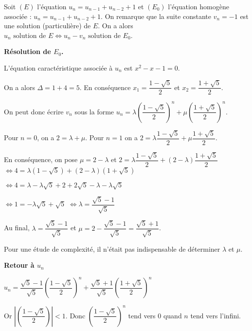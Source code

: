 \documentclass[10pt,fleqn]{article} %
\begin{document}

\vspace{4cm}
\pagestyle{fancy}
\thispagestyle{plain}


\def\columnseprulecolor{\color{ocre}}
\setlength{\columnseprule}{0.4pt} 
\ifprof
\else
\begin{multicols}{2}
\fi




Soit $(E)$ l'équation $u_n = u_{n-1} + u_{n-2}+1$ et $(E_0)$ l'équation homogène associée : $u_n = u_{n-1} + u_{n-2}+1$. On remarque que la suite constante $v_n=-1$ est une solution (particulière) de $E$. 
On a alors $u_n \text{ solution de } E \Leftrightarrow u_n-v_n \text{ solution de } E_0$. 

\textbf{Résolution de $E_0$.}

L'équation caractéristique associée à $u_n$ est $x^2 -x -1=0$. 

On a alors $\Delta = 1+4 = 5$. En conséquence $x_1 = \dfrac{1-\sqrt{5}}{2}$ et $x_2 = \dfrac{1+\sqrt{5}}{2}$.


On peut donc écrire $v_n$ sous la forme $u_n=\lambda \left(\dfrac{1-\sqrt{5}}{2}\right)^n+\mu \left(\dfrac{1+\sqrt{5}}{2}\right)^n$.

Pour $n=0$, on a $2=\lambda+\mu$. Pour $n=1$ on a $2=\lambda \dfrac{1-\sqrt{5}}{2}+\mu \dfrac{1+\sqrt{5}}{2}$.

En conséquence, on pose $\mu=2-\lambda$ et 
$2=\lambda \dfrac{1-\sqrt{5}}{2}+\left(2-\lambda\right) \dfrac{1+\sqrt{5}}{2}$
$\Leftrightarrow 4=\lambda (1-\sqrt{5})+\left(2-\lambda\right) (1+\sqrt{5})$

$\Leftrightarrow 4=\lambda-\lambda\sqrt{5}+ 2+2\sqrt{5}-\lambda - \lambda\sqrt{5}$

$\Leftrightarrow 1=-\lambda\sqrt{5}+\sqrt{5} $
$\Leftrightarrow \lambda=\dfrac{\sqrt{5}-1}{\sqrt{5}} $

Au final, $ \lambda=\dfrac{\sqrt{5}-1}{\sqrt{5}} $ et  $\mu=2-\dfrac{\sqrt{5}-1}{\sqrt{5}}=\dfrac{\sqrt{5}+1}{\sqrt{5}}$.

\begin{rem}
Pour une étude de complexité, il n'était pas indispensable de déterminer $\lambda$ et $\mu$.
\end{rem}
\textbf{Retour à $u_n$}

$ u_n = \dfrac{\sqrt{5}-1}{\sqrt{5}} \left(\dfrac{1-\sqrt{5}}{2}\right)^n+\dfrac{\sqrt{5}+1}{\sqrt{5}} \left(\dfrac{1+\sqrt{5}}{2}\right)^n$


Or $\left|  \left(\dfrac{1-\sqrt{5}}{2}\right) \right| <1$. Donc $\left(\dfrac{1-\sqrt{5}}{2}\right)^n$ tend vers 0 quand $n$ tend vers l'infini.


\end{multicols}
\end{document}
